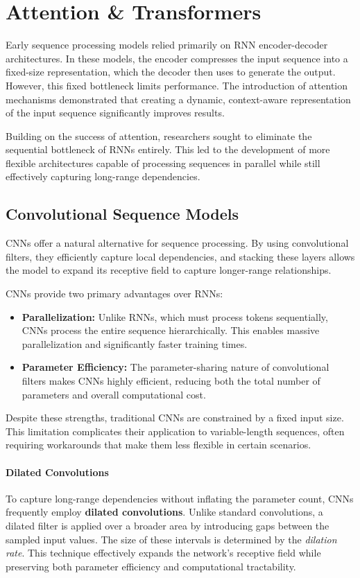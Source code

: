 \section{Attention \& Transformers}
Early sequence processing models relied primarily on RNN encoder-decoder architectures.
In these models, the encoder compresses the input sequence into a fixed-size representation, which the decoder then uses to generate the output. 
However, this fixed bottleneck limits performance. The introduction of attention mechanisms demonstrated that creating a dynamic, context-aware representation of the input sequence significantly improves results. 

Building on the success of attention, researchers sought to eliminate the sequential bottleneck of RNNs entirely. 
This led to the development of more flexible architectures capable of processing sequences in parallel while still effectively capturing long-range dependencies.

\subsection{Convolutional Sequence Models}
CNNs offer a natural alternative for sequence processing.
By using convolutional filters, they efficiently capture local dependencies, and stacking these layers allows the model to expand its receptive field to capture longer-range relationships.

CNNs provide two primary advantages over RNNs:
\begin{itemize}
    \item \textbf{Parallelization:} Unlike RNNs, which must process tokens sequentially, CNNs process the entire sequence hierarchically. 
    This enables massive parallelization and significantly faster training times.
    
    \item \textbf{Parameter Efficiency:} The parameter-sharing nature of convolutional filters makes CNNs highly efficient, 
    reducing both the total number of parameters and overall computational cost.
\end{itemize}

Despite these strengths, traditional CNNs are constrained by a fixed input size. This limitation complicates their application 
to variable-length sequences, often requiring workarounds that make them less flexible in certain scenarios.

\paragraph{Dilated Convolutions}
To capture long-range dependencies without inflating the parameter count, CNNs frequently employ \textbf{dilated convolutions}. 
Unlike standard convolutions, a dilated filter is applied over a broader area by introducing gaps between the sampled input values. 
The size of these intervals is determined by the \textit{dilation rate}. This technique effectively expands the network's receptive field while preserving both parameter efficiency and computational tractability.

